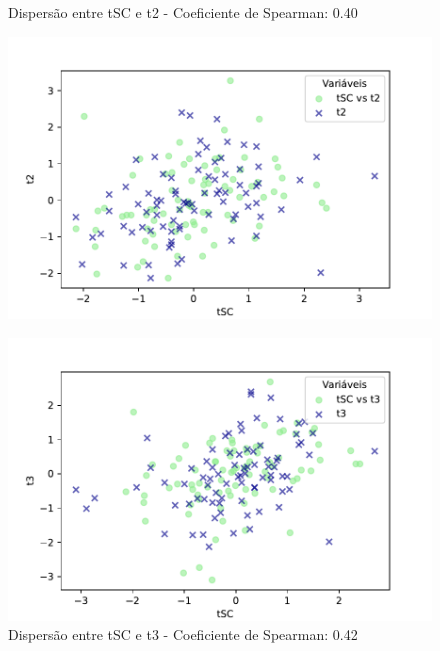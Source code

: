 \begin{figure}[h]
    \captionsetup{font=footnotesize, justification=centering, labelsep=period, position=above}
    \centering
    \begin{minipage}[b]{0.45\linewidth}
        \caption{Dispersão entre tSC e t2 - Coeficiente de Spearman: 0.40}
        \label{fig:tSC-t2}
        \centering
        \includegraphics[scale=0.35]{figuras/Spearman/tSC-t2.pdf}
        \vspace{0.3cm}
        \begin{minipage}{\linewidth}
            \centering
        \end{minipage}
    \end{minipage}
    \hspace{0.05\linewidth}
    \begin{minipage}[b]{0.45\linewidth}
        \caption{Dispersão entre tSC e t3 - Coeficiente de Spearman: 0.42}
        \label{fig:tSC-t3}
        \centering
        \includegraphics[scale=0.35]{figuras/Spearman/tSC-t3.pdf}

\end{minipage}
\end{figure}
